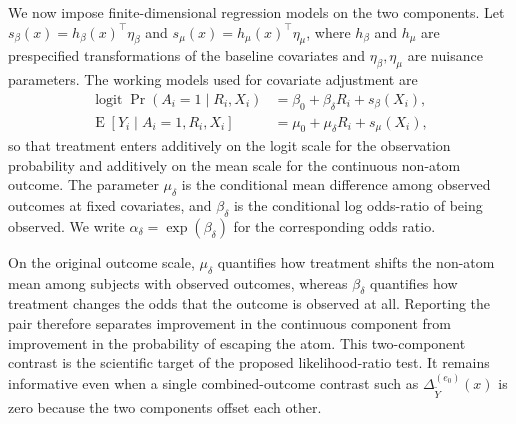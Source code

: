 \documentclass[11pt]{article}
\DeclareMathOperator*{\E}{E}
\DeclareMathOperator*{\logit}{logit}
\begin{document}
We now impose finite-dimensional regression models on the two components. Let $s_\beta(x) = h_\beta(x)^\top\eta_\beta$ and $s_\mu(x) = h_\mu(x)^\top\eta_\mu$, where $h_\beta$ and $h_\mu$ are prespecified transformations of the baseline covariates and $\eta_\beta,\eta_\mu$ are nuisance parameters. The working models used for covariate adjustment are
\begin{align}
  \logit \Pr(A_i = 1 \mid R_i, X_i)
  &= \beta_0 + \beta_\delta R_i + s_\beta(X_i),\label{eq:glm1}\\
  \E[Y_i \mid A_i = 1, R_i, X_i]
  &= \mu_0 + \mu_\delta R_i + s_\mu(X_i),\label{eq:glm2}
\end{align}
so that treatment enters additively on the logit scale for the observation probability and additively on the mean scale for the continuous non-atom outcome. The parameter $\mu_\delta$ is the conditional mean difference among observed outcomes at fixed covariates, and $\beta_\delta$ is the conditional log odds-ratio of being observed. We write $\alpha_\delta = \exp(\beta_\delta)$ for the corresponding odds ratio.

On the original outcome scale, $\mu_\delta$ quantifies how treatment shifts the non-atom mean among subjects with observed outcomes, whereas $\beta_\delta$ quantifies how treatment changes the odds that the outcome is observed at all. Reporting the pair therefore separates improvement in the continuous component from improvement in the probability of escaping the atom. This two-component contrast is the scientific target of the proposed likelihood-ratio test. It remains informative even when a single combined-outcome contrast such as $\Delta_{\widetilde{Y}}^{(e_0)}(x)$ is zero because the two components offset each other.
\end{document}
